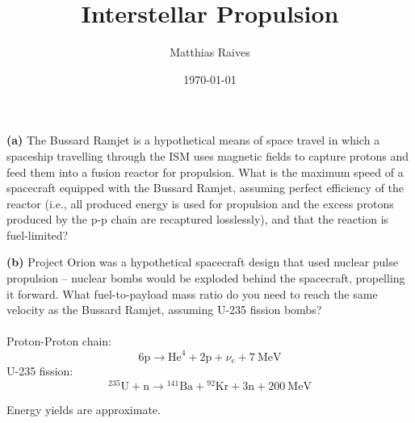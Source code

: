 \documentclass[a4paper]{article}
\title{Interstellar Propulsion}
\author{Matthias Raives}
\date{\today}
\begin{document}
  
  \maketitle
  
  \textbf{(a)} The Bussard Ramjet is a hypothetical means of space travel in which a spaceship travelling through the ISM uses magnetic fields to capture protons and feed them into a fusion reactor for propulsion.  What is the maximum speed of a spacecraft equipped with the Bussard Ramjet, assuming perfect efficiency of the reactor (i.e., all produced energy is used for propulsion and the excess protons produced by the p-p chain are recaptured losslessly), and that the reaction is fuel-limited?
  
  \textbf{(b)} Project Orion was a hypothetical spacecraft design that used nuclear pulse propulsion -- nuclear bombs would be exploded behind the spacecraft, propelling it forward.  What fuel-to-payload mass ratio do you need to reach the same velocity as the Bussard Ramjet, assuming U-235 fission bombs?\\
  \\
  Proton-Proton chain:
  \begin{equation}
      6\mathrm{p} \rightarrow \mathrm{He}^{4} + 2\mathrm{p} + \nu_{e} + \SI{7}{\mega\eV}
  \end{equation}
  \noindent U-235 fission:
  \begin{equation}
      {}^{235}\mathrm{U} + \mathrm{n} \rightarrow {}^{141}\mathrm{Ba} + {}^{92}\mathrm{Kr} + 3\mathrm{n} + \SI{200}{\mega\eV}
  \end{equation}
  
  \noindent Energy yields are approximate.
  
\end{document}
